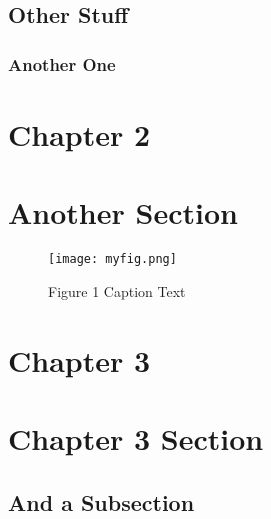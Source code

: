 \documentclass[12pt]{article}
\begin{document}
\subsection{Other Stuff}
\label{subsec:1.1}

\subsubsection{Another One}
\label{subsubsec:1.1.1}
\newpage
\section*{Chapter 2}
\bigskip
\section{Another Section}
\label{sec:2}
\begin{figure*}
\texttt{[image: myfig.png]}
\caption{Figure 1 Caption Text}
\label{fig:errorbars}
\end{figure*}
\newpage
\section*{Chapter 3}
\bigskip
\section{Chapter 3 Section}
\label{sec:3}
\subsection{And a Subsection}
\label{subsec:3.1}
\end{document}
